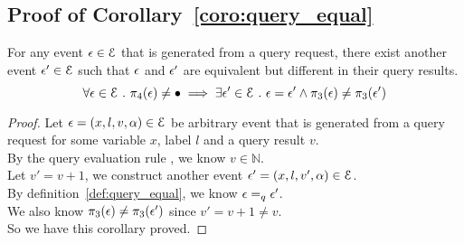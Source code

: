 \subsection{Proof of Corollary~\ref{coro:query_equal}}
\label{apdx:query_equal}
\begin{corollary}
For any event $\mathtt{\epsilon} \in \mathcal{E}$  that is generated from a query request, 
there exist another event $\mathtt{\epsilon}' \in \mathcal{E}$ 
such that 
$\mathtt{\epsilon}$ and $\mathtt{\epsilon}'$ are equivalent but different in their query results.
\[
\forall \mathtt{\epsilon} \in \mathcal{E} ~.~ 
\pi_4(\mathtt{\epsilon}) \neq \bullet
\implies \exists 
\mathtt{\epsilon}' \in \mathcal{E} ~.~ 
\mathtt{\epsilon} = \mathtt{\epsilon}' \land  \pi_3(\mathtt{\epsilon}) \neq \pi_3(\mathtt{\epsilon}')
\]
\end{corollary}   
\begin{proof}
Let $\mathtt{\epsilon} = (x, l, v, \alpha) \in \mathcal{E}$ be arbitrary event that  is generated from a query request for some variable $x$, label $l$ and a query result $v$.
\\
By the query evaluation rule , we know $v \in \mathbb{N}$.
\\
Let $v' = v + 1$, we construct another event $\mathtt{\epsilon}' = (x, l, v', \alpha) \in \mathcal{E}$.
\\
By definition~\ref{def:query_equal}, we know $\mathtt{\epsilon} =_{q}\mathtt{\epsilon}'$.
\\
We also know $ \pi_3(\mathtt{\epsilon}) \neq \pi_3(\mathtt{\epsilon}')$ since $v' = v + 1 \neq v$.
\\
So we have this corollary proved.
\end{proof}  

